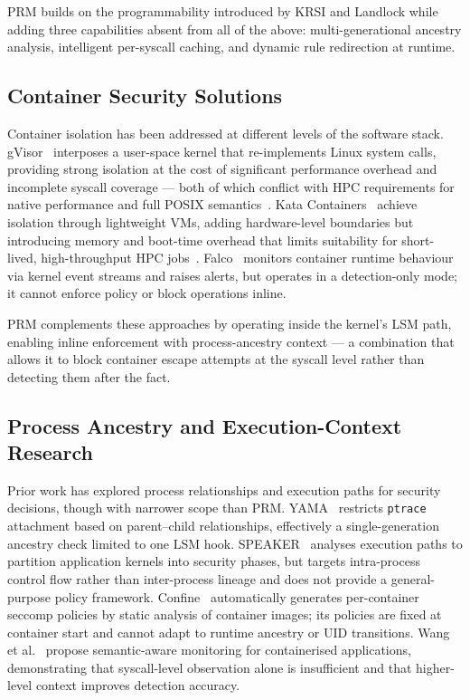 \documentclass[]{sn-jnl}
\begin{document}
PRM builds on the programmability introduced by KRSI and Landlock while adding
three capabilities absent from all of the above: multi-generational ancestry
analysis, intelligent per-syscall caching, and dynamic rule redirection at
runtime.

\subsection{Container Security Solutions}

Container isolation has been addressed at different levels of the software stack.
gVisor~\cite{google2018gvisor} interposes a user-space kernel that re-implements
Linux system calls, providing strong isolation at the cost of significant
performance overhead and incomplete syscall coverage --- both of which conflict
with HPC requirements for native performance and full POSIX
semantics~\cite{torrez2019hpc}.
Kata Containers~\cite{kata2018architecture} achieve isolation through lightweight
VMs, adding hardware-level boundaries but introducing memory and boot-time
overhead that limits suitability for short-lived, high-throughput HPC
jobs~\cite{xavier2013performance}.
Falco~\cite{falco2016runtime} monitors container runtime behaviour via kernel
event streams and raises alerts, but operates in a detection-only mode; it cannot
enforce policy or block operations inline.

PRM complements these approaches by operating inside the kernel's LSM path,
enabling inline enforcement with process-ancestry context --- a combination that
allows it to block container escape attempts at the syscall level rather than
detecting them after the fact.

\subsection{Process Ancestry and Execution-Context Research}

Prior work has explored process relationships and execution paths for security
decisions, though with narrower scope than PRM.
YAMA~\cite{cook2012yama} restricts \texttt{ptrace} attachment based on
parent--child relationships, effectively a single-generation ancestry check
limited to one LSM hook.
SPEAKER~\cite{li2018speaker} analyses execution paths to partition application
kernels into security phases, but targets intra-process control flow rather than
inter-process lineage and does not provide a general-purpose policy framework.
Confine~\cite{ghavamnia2020confine} automatically generates per-container seccomp
policies by static analysis of container images; its policies are fixed at
container start and cannot adapt to runtime ancestry or UID transitions.
Wang et al.~\cite{wang2021semantic} propose semantic-aware monitoring for
containerised applications, demonstrating that syscall-level observation alone is
insufficient and that higher-level context improves detection accuracy.
\end{document}

